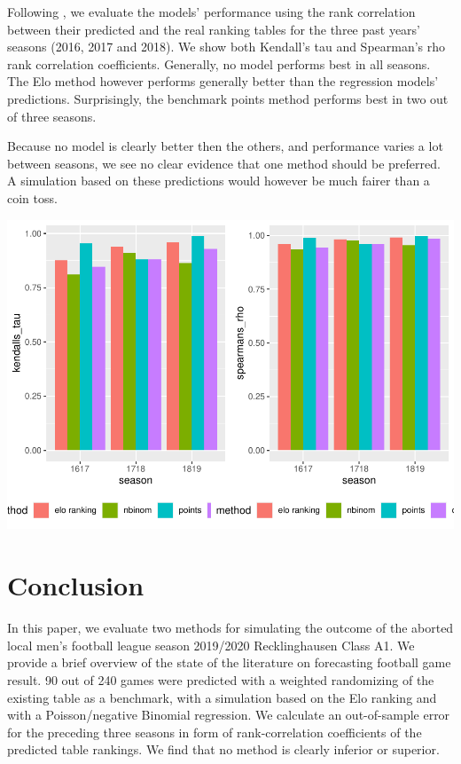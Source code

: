 \documentclass[12pt,a4paper]{article}
\begin{document}
Following \textcite{leitner2010}, we evaluate the models' performance
using the rank correlation between their predicted and the real ranking
tables for the three past years' seasons (2016, 2017 and 2018). We show
both Kendall's tau and Spearman's rho rank correlation coefficients.
Generally, no model performs best in all seasons. The Elo method however
performs generally better than the regression models' predictions.
Surprisingly, the benchmark points method performs best in two out of
three seasons.

Because no model is clearly better then the others, and performance
varies a lot between seasons, we see no clear evidence that one method
should be preferred. A simulation based on these predictions would
however be much fairer than a coin toss.



\includegraphics{term_paper_eem_files/figure-latex/unnamed-chunk-9-1.pdf}

\hypertarget{conclusion}{%
\section{Conclusion}\label{conclusion}}

In this paper, we evaluate two methods for simulating the outcome of the
aborted local men's football league season 2019/2020 Recklinghausen
Class A1. We provide a brief overview of the state of the literature on
forecasting football game result. 90 out of 240 games were predicted
with a weighted randomizing of the existing table as a benchmark, with a
simulation based on the Elo ranking and with a Poisson/negative Binomial
regression. We calculate an out-of-sample error for the preceding three
seasons in form of rank-correlation coefficients of the predicted table
rankings. We find that no method is clearly inferior or superior.
\end{document}
